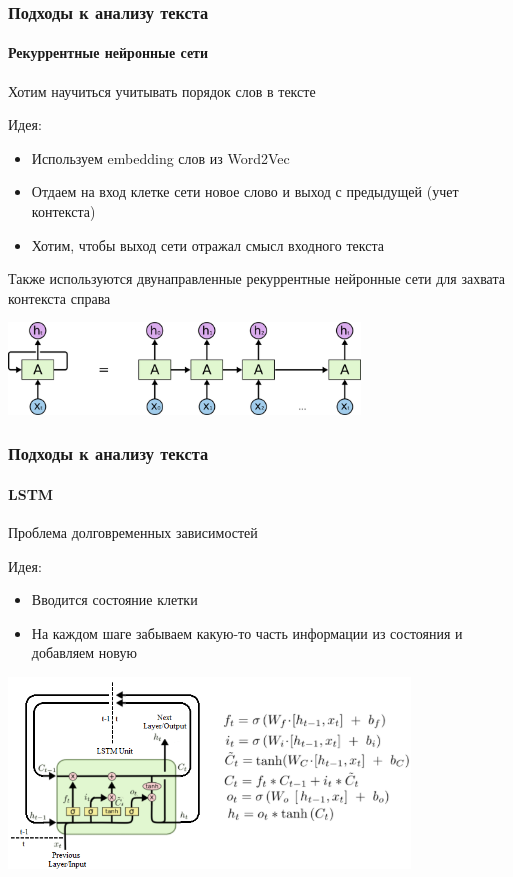 \documentclass[10pt]{beamer}
\begin{document}

\begin{frame}
\frametitle{Подходы к анализу текста}
\framesubtitle{Рекуррентные нейронные сети}

Хотим научиться учитывать порядок слов в тексте
    	
Идея:
\begin{itemize}
	\item Используем embedding слов из Word2Vec
	\item Отдаем на вход клетке сети новое слово и выход с предыдущей (учет контекста)
	\item Хотим, чтобы выход сети отражал смысл входного текста
\end{itemize}

Также используются двунаправленные рекуррентные нейронные сети для захвата контекста справа

\begin{center}
\includegraphics[width=0.7\textwidth]{images/rnn.png}
\end{center}

\end{frame}



\begin{frame}
\frametitle{Подходы к анализу текста}
\framesubtitle{LSTM}

Проблема долговременных зависимостей
    	
Идея:
\begin{itemize}
	\item Вводится состояние клетки
	\item На каждом шаге забываем какую-то часть информации из состояния и добавляем новую
\end{itemize}

\begin{center}
\includegraphics[width=0.8\textwidth]{images/lstm.png}
\end{center}

\end{frame}
\end{document}
